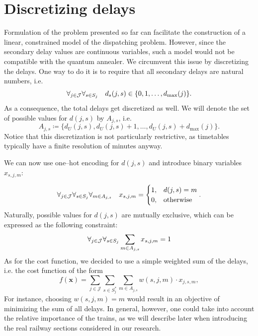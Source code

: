 \section{Discretizing delays}
Formulation of the problem presented so far can facilitate the construction of
a linear, constrained model of the dispatching problem. However, since the
secondary delay values are continuous variables, such a model would not be
compatible with the quantum annealer. We circumvent this issue by discretizing
the delays. One way to do it is to require that all secondary delays are
natural numbers, i.e.
\begin{equation}
  \forall_{j \in \mathcal{J}} \forall_{s \in S_{j}}\quad  d_{s}(j, s) \in \{0, 1, \ldots, d_{\max}(j)\}.
\end{equation}
As a consequence, the total delays get discretized as well. We will denote the
set of possible values for $d(j, s)$ by $A_{j, s}$, i.e.
\begin{equation}
  A_{j, s} \coloneq \{d_{U}(j, s), d_{U}(j, s) + 1, \ldots, d_{U}(j, s) + d_{\max}(j)\}.
\end{equation}
Notice that this discretization is not particularly restrictive, as timetables
typically have a finite resolution of minutes anyway.

We can now use one--hot encoding for $d(j, s)$ and introduce binary variables
$x_{s, j, m}$:

\begin{equation}
  \label{eq:onehotconstraint}
  \forall_{j \in \mathcal{J}}\forall_{s \in S_{j}} \forall_{m \in A_{j, s}} \quad x_{s,j,m} = \begin{cases}
    1, & d(j, s) = m      \\
    0, & \mbox{otherwise}
  \end{cases}.
\end{equation}
Naturally, possible values for $d(j, s)$ are mutually exclusive, which can be
expressed as the following constraint:
\begin{equation}
  \forall_{j \in \mathcal{J}}\forall_{s \in S_{j}} \sum_{m \in A_{j, s}} x_{s, j, m} = 1
\end{equation}
As for the cost function, we decided to use a simple weighted sum of the
delays, i.e. the cost function of the form
\begin{equation}
  \label{eq:qubo:cost}
  f(\mathbf{x}) = \sum_{j \in \mathcal{J}}\sum_{s \in S^{*}_{j}}\sum_{m \in A_{j,s}} w(s,j,m) \cdot x_{j,s,m},
\end{equation}
For instance, choosing $w(s, j, m)=m$ would result in an objective of
minimizing the sum of all delays. In general, however, one could take into
account the relative importance of the trains, as we will describe later when
introducing the real railway sections considered in our research.

